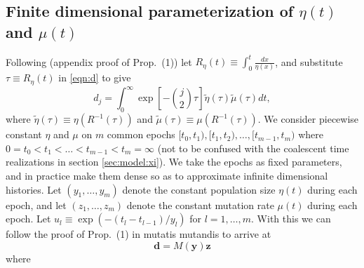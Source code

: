 \documentclass[11pt]{article}
\begin{document}
\subsection{Finite dimensional parameterization of $\eta(t)$ and $\mu(t)$}\label{sec:model:pcsws}

Following \cite{Rosen2018-bb} (appendix proof of Prop.\ (1)) let $R_\eta(t) \equiv \int_0^t\frac{dx}{\eta(x)}$, and substitute $\tau \equiv R_\eta(t)$ in \ref{eqn:d} to give
\begin{equation}
\label{eqn:d2}
d_j = \int_0^\infty \exp\left[-\binom{j}{2}\tau\right] \tilde\eta(\tau)\tilde\mu(\tau)dt,
\end{equation}
where $\tilde\eta(\tau) \equiv \eta(R^{-1}(\tau))$ and $\tilde\mu(\tau) \equiv \mu(R^{-1}(\tau))$.
We consider piecewise constant $\eta$ and $\mu$ on $m$ common epochs $[t_0, t_1), [t_1, t_2),\dots, [t_{m-1}, t_m)$ where $0=t_0 < t_1 < \dots < t_{m-1} < t_m=\infty$ (not to be confused with the coalescent time realizations in section \ref{sec:model:xi}).
We take the epochs as fixed parameters, and in practice make them dense so as to approximate infinite dimensional histories.
Let $(y_1,\dots,y_m)$ denote the constant population size $\eta(t)$ during each epoch, and let $(z_1,\dots,z_m)$ denote the constant mutation rate $\mu(t)$ during each epoch.
Let $u_l \equiv \exp(-(t_l-t_{l-1})/y_l)$ for $l=1,\dots,m$. %
With this we can follow the proof of Prop.\ (1) in \cite{Rosen2018-bb} mutatis mutandis to arrive at
\begin{equation}
\label{eqn:d3}
\boldsymbol d = M(\boldsymbol y) \boldsymbol z
\end{equation}
where
\end{document}
